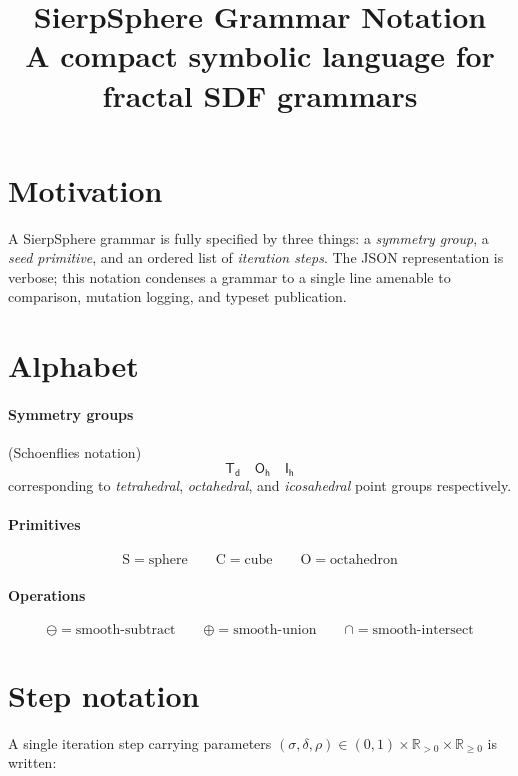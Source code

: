 \documentclass[11pt, a4paper]{article}
\title{\textbf{SierpSphere Grammar Notation}\\
       \large A compact symbolic language for fractal SDF grammars}
\author{}
\date{}
\newcommand{\G}[1]{\mathsf{#1}}          %
\newcommand{\prim}[1]{\mathrm{#1}}       %
\newcommand{\sub}{\ominus}               %
\newcommand{\add}{\oplus}                %
\newcommand{\intr}{\cap}                 %
\begin{document}
\maketitle
\thispagestyle{empty}

\section*{Motivation}

A SierpSphere grammar is fully specified by three things: a \emph{symmetry group},
a \emph{seed primitive}, and an ordered list of \emph{iteration steps}.
The JSON representation is verbose; this notation condenses a grammar to a
single line amenable to comparison, mutation logging, and typeset publication.

\section*{Alphabet}

\paragraph{Symmetry groups} (Schoenflies notation)
\[
  \G{T_d} \quad \G{O_h} \quad \G{I_h}
\]
corresponding to \textit{tetrahedral}, \textit{octahedral}, and
\textit{icosahedral} point groups respectively.

\paragraph{Primitives}
\[
  \prim{S} = \text{sphere} \qquad
  \prim{C} = \text{cube}   \qquad
  \prim{O} = \text{octahedron}
\]

\paragraph{Operations}
\[
  \sub = \text{smooth-subtract} \qquad
  \add = \text{smooth-union}    \qquad
  \intr = \text{smooth-intersect}
\]

\section*{Step notation}

A single iteration step carrying parameters
$(\sigma, \delta, \rho) \in (0,1)\times\mathbb{R}_{>0}\times\mathbb{R}_{\ge 0}$
is written:
\end{document}

